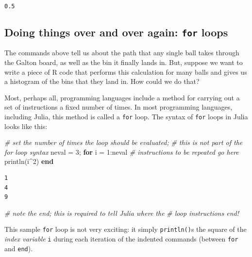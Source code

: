 \documentclass[
  11pt,
]{book}
\newenvironment{Shaded}{\begin{snugshade}}{\end{snugshade}}
\newcommand{\CommentTok}[1]{\textcolor[rgb]{0.37,0.37,0.37}{\textit{#1}}}
\newcommand{\FloatTok}[1]{\textcolor[rgb]{0.06,0.06,0.06}{#1}}
\newcommand{\KeywordTok}[1]{\textcolor[rgb]{0.27,0.27,0.27}{\textbf{#1}}}
\newcommand{\NormalTok}[1]{#1}
\begin{document}
\begin{verbatim}
0.5
\end{verbatim}

\hypertarget{doing-things-over-and-over-again-for-loops}{%
\subsection{\texorpdfstring{Doing things over and over again: \texttt{for} loops}{Doing things over and over again: for loops}}\label{doing-things-over-and-over-again-for-loops}}

The commands above tell us about the path that any single ball takes through the Galton board, as well as the bin it finally lands in. But, suppose we want to write a piece of R code that performs this calculation for many balls and gives us a histogram of the bins that they land in. How could we do that?

Most, perhaps all, programming languages include a method for carrying out a set of instructions a fixed number of times. In most programming languages, including Julia, this method is called a \texttt{for} loop. The syntax of \texttt{for} loops in Julia looks like this:

\begin{Shaded}
\begin{Highlighting}[]
\CommentTok{# set the number of times the loop should be evaluated; }
\CommentTok{# this is not part of the for loop syntax}
\NormalTok{neval = }\FloatTok{3}\NormalTok{; }
\KeywordTok{for}\NormalTok{ i = }\FloatTok{1}\NormalTok{:neval}
  \CommentTok{# instructions to be repeated go here }
\NormalTok{  println(i^}\FloatTok{2}\NormalTok{)}
\KeywordTok{end} 
\end{Highlighting}
\end{Shaded}

\begin{verbatim}
1
4
9
\end{verbatim}

\begin{Shaded}
\begin{Highlighting}[]
\CommentTok{# note the end; this is required to tell Julia where the }
\CommentTok{# loop instructions end!}
\end{Highlighting}
\end{Shaded}

This sample \texttt{for} loop is not very exciting: it simply \texttt{println()}s the square of the \emph{index variable} \texttt{i} during each iteration of the indented commands (between \texttt{for} and \texttt{end}).
\end{document}
